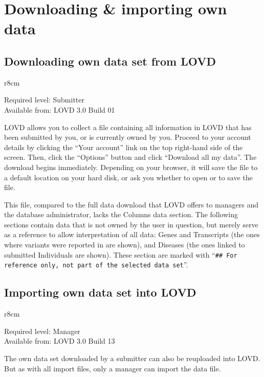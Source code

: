 \hypertarget{sec:download_import_own_data}{}
\section{Downloading \& importing own data}



\hypertarget{ssec:download_owned_data}{}
\subsection{Downloading own data set from LOVD}
\begin{wrapfigure}[3]{r}{8cm} %
  \vspace{-25pt}
  \begin{leftbar}
    Required level: Submitter\\
    Available from: LOVD 3.0 Build 01
  \end{leftbar}
\end{wrapfigure}
LOVD allows you to collect a file containing all information in LOVD that has been submitted by you, or is
 currently owned by you.
Proceed to your account details by clicking the ``Your account'' link on the top right-hand side of the screen.
Then, click the ``Options'' button and click ``Download all my data''.
The download begins immediately.
Depending on your browser, it will save the file to a default location on your hard disk, or ask you whether
 to open or to save the file.

This file, compared to the full data download that LOVD offers to managers and the database administrator,
 lacks the Columns data section.
The following sections contain data that is not owned by the user in question, but merely serve as a reference
 to allow interpretation of all data:
 Genes and Transcripts (the ones where variants were reported in are shown), and Diseases (the ones linked to
 submitted Individuals are shown).
These section are marked with ``\texttt{\#\# For reference only, not part of the selected data set}''.



\hypertarget{ssec:import_owned_data}{}
\subsection{Importing own data set into LOVD}
\begin{wrapfigure}[3]{r}{8cm} %
  \vspace{-25pt}
  \begin{leftbar}
    Required level: Manager\\
    Available from: LOVD 3.0 Build 13
  \end{leftbar}
\end{wrapfigure}
The own data set downloaded by a submitter can also be reuploaded into LOVD.
But as with all import files, only a manager can import the data file.

